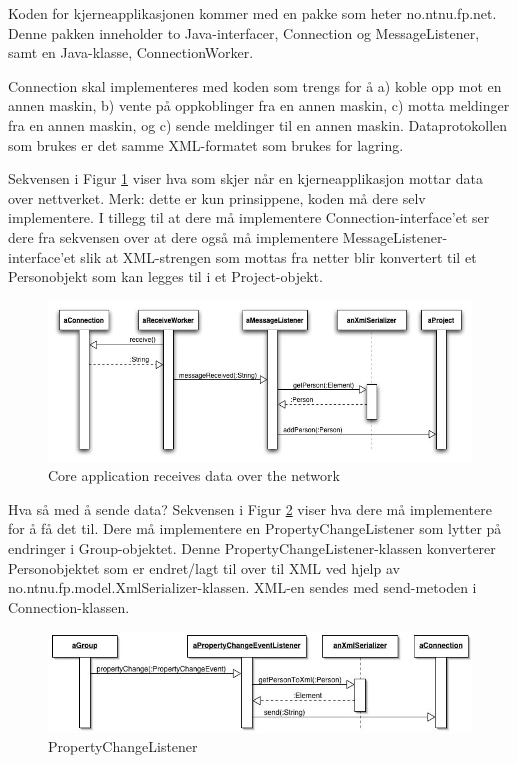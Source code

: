\documentclass[a4paper]{scrartcl}
\begin{document}
Koden for kjerneapplikasjonen kommer med en pakke som heter no.ntnu.fp.net. Denne pakken inneholder to Java-interfacer, Connection og MessageListener, samt en Java-klasse, ConnectionWorker.

Connection skal implementeres med koden som trengs for å a) koble opp mot en annen maskin, b) vente på oppkoblinger fra en annen maskin, c) motta meldinger fra en annen maskin, og c) sende meldinger til en annen maskin. Dataprotokollen som brukes er det samme XML-formatet som brukes for lagring.  

Sekvensen i Figur \ref{fig:sequence-core-application-receive-data} viser hva som skjer når en kjerneapplikasjon mottar data over nettverket. Merk: dette er kun prinsippene, koden må dere selv implementere. I tillegg til at dere må implementere Connection-interface'et ser dere fra sekvensen over at dere også må implementere MessageListener-interface'et slik at XML-strengen som mottas fra netter blir konvertert til et Personobjekt som kan legges til i et Project-objekt.

\begin{figure}[H]
    \centering
    \includegraphics[width=\textwidth]{resources/sequence-core-application-receive-data.jpg}
    \caption{Core application receives data over the network}
    \label{fig:sequence-core-application-receive-data}
\end{figure}

Hva så med å sende data? Sekvensen i Figur \ref{fig:sequence-property-change-listener} viser hva dere må implementere for å få det til. Dere må implementere en PropertyChangeListener som lytter på endringer i Group-objektet. Denne PropertyChangeListener-klassen konverterer Personobjektet som er endret/lagt til over til XML ved hjelp av no.ntnu.fp.model.XmlSerializer-klassen. XML-en sendes med send-metoden i Connection-klassen.

\begin{figure}[H]
    \centering
    \includegraphics[width=\textwidth]{resources/sequence-property-change-listener.jpg}
    \caption{PropertyChangeListener}
    \label{fig:sequence-property-change-listener}
\end{figure}
\end{document}
